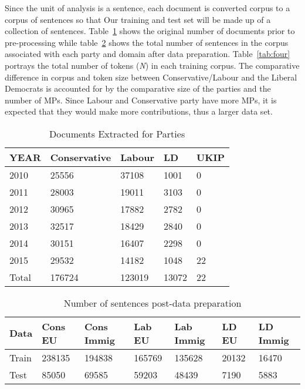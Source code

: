 Since the unit of analysis is a sentence, each document is converted corpus to a corpus of sentences so that Our training and test set  will be made up of a collection of sentences. Table~\ref{tab:two} shows the original number of documents prior to pre-processing while table~\ref{tab:three} shows the total number of sentences in the corpus associated with each party and domain after data preparation. Table~\ref{tab:four} portrays the total number of tokens (\emph{N}) in each training corpus. The comparative difference in corpus and token size between Conservative/Labour and the Liberal Democrats is accounted for by the comparative size of the parties and the number of MPs. Since Labour and Conservative party have more MPs, it is expected that they would make more contributions, thus a larger data set.

\begin{table}%
\caption{Documents Extracted for Parties}
\label{tab:two}
\begin{minipage}{\columnwidth}
\begin{center}
\begin{tabular}{lllll}
  \toprule
  YEAR   &  Conservative & Labour & LD & UKIP\\
  \toprule
  2010     & 25556 & 37108 & 1001 & 0 \\
  2011	& 28003	& 19011	& 3103	& 0 \\
2012	& 30965	& 17882	& 2782	& 0 \\
2013	& 32517	& 18429	& 2840	& 0 \\
2014	& 30151	& 16407	& 2298	& 0 \\
2015	& 29532	& 14182	& 1048	& 22 \\
Total	& 176724	& 123019 &	13072 &	22 \\

  \bottomrule
\end{tabular}
\end{center}
\bigskip\centering

\end{minipage}
\end{table}%


\begin{table}%
\caption{Number of sentences post-data preparation}
\label{tab:three}
\begin{minipage}{\columnwidth}
\begin{center}
\begin{tabular}{lllllll}
  \toprule
  Data	 &  Cons EU & Cons Immig & Lab EU & Lab Immig & LD EU & LD Immig\\
  \toprule
Train	& 238135	& 194838	& 165769	& 135628	& 20132	& 16470 \\
Test	& 85050	& 69585	& 59203	& 48439	& 7190	& 5883 \\


  \bottomrule
\end{tabular}
\end{center}
\bigskip\centering

\end{minipage}
\end{table}%


